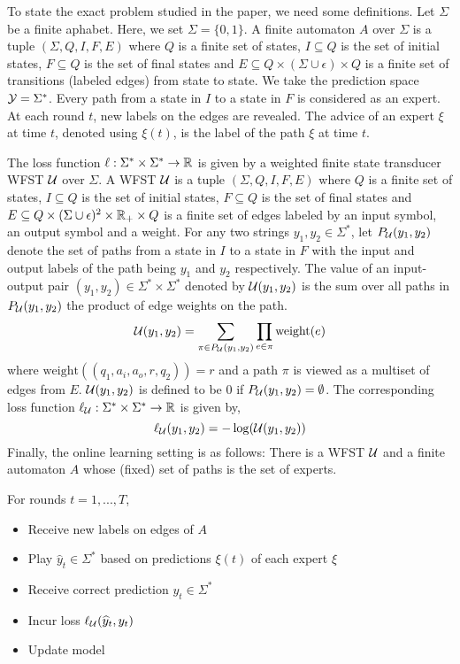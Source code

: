 To state the exact problem studied in the paper, we need some definitions. Let $\Sigma$ be a finite aphabet. Here, we set $\Sigma = \{0,1\}$. A finite automaton $A$ over $\Sigma$ is a tuple $(\Sigma,Q,I,F,E)$ where $Q$ is a finite set of states, $I\subseteq Q$ is the set of initial states, $F\subseteq Q$ is the set of final states and $E \subseteq Q \times (\Sigma \cup \epsilon) \times Q$ is a finite set of transitions (labeled edges) from state to state. We take the prediction space ${\mathcal Y} = \Sigma^*$. Every path from a state in $I$ to a state in $F$ is considered as an expert. At each round $t$, new labels on the edges are revealed. The advice of an expert $\xi$ at time $t$, denoted using $\xi(t)$, is the label of the path $\xi$ at time $t$.

The loss function $\ell: \Sigma^* \times \Sigma^* \to {\mathbb R}$ is given by a weighted finite state transducer WFST ${\mathcal{U }}$ over $\Sigma$. A WFST ${\mathcal{U }}$ is a tuple $(\Sigma,Q,I,F,E)$ where $Q$ is a finite set of states, $I \subseteq Q$ is the set of initial states, $F \subseteq Q$ is the set of final states and $E \subseteq Q \times (\Sigma\cup\epsilon)^2 \times {\mathbb R}_+ \times Q$ is a finite set of edges labeled by an input symbol, an output symbol and a weight. For any two strings $y_1,y_2 \in \Sigma^*$, let $P_{\mathcal{U }}(y_1,y_2)$ denote the set of paths from a state in $I$ to a state in $F$ with the input and output labels of the path being $y_1$ and $y_2$ respectively. The value of an input-output pair $(y_1,y_2) \in \Sigma^*\times\Sigma^*$ denoted by ${\mathcal{U }}(y_1,y_2)$ is the sum over all paths in $P_{\mathcal{U }}(y_1,y_2)$ the product of edge weights on the path.
$${\mathcal{U }}(y_1,y_2) = \sum_{\pi \in P_{\mathcal{U }}(y_1,y_2)}\prod_{e\in\pi}\text{weight}(e)$$
where $\text{weight}((q_1,a_i,a_o,r,q_2)) = r$ and a path $\pi$ is viewed as a multiset of edges from $E$. ${\mathcal{U }}(y_1,y_2)$ is defined to be $0$ if $P_{\mathcal{U }}(y_1,y_2) = \emptyset$. The corresponding loss function $\ell_{\mathcal{U }}:\Sigma^*\times\Sigma^* \to {\mathbb R}$ is given by,
$$\ell_{\mathcal{U }}(y_1,y_2) = -\log({\mathcal{U }}(y_1,y_2))$$
Finally, the online learning setting is as follows: There is a WFST ${\mathcal{U }}$ and a finite automaton $A$ whose (fixed) set of paths is the set of experts.

For rounds $t = 1,...,T$,
\begin{itemize}
 \item Receive new labels on edges of $A$
 \item Play $\hat{y}_t \in \Sigma^*$ based on predictions $\xi(t)$ of each expert $\xi$
 \item Receive correct prediction $y_t \in \Sigma^*$
 \item Incur loss $\ell_{\mathcal{U }}(\widehat{y}_t,y_t)$
 \item Update model
\end{itemize}

